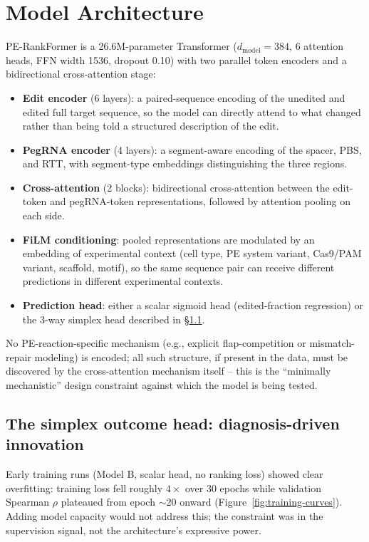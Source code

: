 \documentclass[11pt]{article}
\begin{document}
\section{Model Architecture}

PE-RankFormer is a 26.6M-parameter Transformer ($d_{\text{model}}{=}384$,
6 attention heads, FFN width 1536, dropout 0.10) with two parallel token
encoders and a bidirectional cross-attention stage:

\begin{itemize}
\item \textbf{Edit encoder} (6 layers): a paired-sequence encoding of the
  unedited and edited full target sequence, so the model can directly attend
  to what changed rather than being told a structured description of the edit.
\item \textbf{PegRNA encoder} (4 layers): a segment-aware encoding of the
  spacer, PBS, and RTT, with segment-type embeddings distinguishing the three
  regions.
\item \textbf{Cross-attention} (2 blocks): bidirectional cross-attention between
  the edit-token and pegRNA-token representations, followed by attention
  pooling on each side.
\item \textbf{FiLM conditioning}: pooled representations are modulated by an
  embedding of experimental context (cell type, PE system variant, Cas9/PAM
  variant, scaffold, motif), so the same sequence pair can receive different
  predictions in different experimental contexts.
\item \textbf{Prediction head}: either a scalar sigmoid head (edited-fraction
  regression) or the 3-way simplex head described in \S\ref{sec:simplex}.
\end{itemize}

No PE-reaction-specific mechanism (e.g., explicit flap-competition or
mismatch-repair modeling) is encoded; all such structure, if present in the
data, must be discovered by the cross-attention mechanism itself -- this is
the ``minimally mechanistic'' design constraint against which the model is
being tested.

\subsection{The simplex outcome head: diagnosis-driven innovation}
\label{sec:simplex}

Early training runs (Model B, scalar head, no ranking loss) showed clear
overfitting: training loss fell roughly $4\times$ over 30 epochs while
validation Spearman $\rho$ plateaued from epoch $\sim$20 onward
(Figure~\ref{fig:training-curves}). Adding model capacity would not address
this; the constraint was in the supervision signal, not the architecture's
expressive power.
\end{document}
